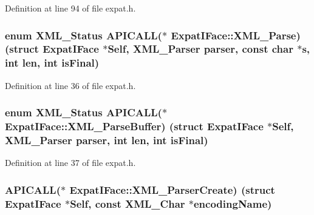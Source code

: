 Definition at line 94 of file expat.\+h.

\subsubsection[{\texorpdfstring{X\+M\+L\+\_\+\+Parse}{XML_Parse}}]{\setlength{\rightskip}{0pt plus 5cm}enum {\bf X\+M\+L\+\_\+\+Status} A\+P\+I\+C\+A\+LL($\ast$ Expat\+I\+Face\+::\+X\+M\+L\+\_\+\+Parse) (struct {\bf Expat\+I\+Face} $\ast$Self, {\bf X\+M\+L\+\_\+\+Parser} parser, {\bf const} char $\ast${\bf s}, {\bf int} {\bf len}, {\bf int} is\+Final)}\hypertarget{struct_expat_i_face_a05bedd71a3ea3efc2612dff99eb9cd5a}{}\label{struct_expat_i_face_a05bedd71a3ea3efc2612dff99eb9cd5a}


Definition at line 36 of file expat.\+h.

\subsubsection[{\texorpdfstring{X\+M\+L\+\_\+\+Parse\+Buffer}{XML_ParseBuffer}}]{\setlength{\rightskip}{0pt plus 5cm}enum {\bf X\+M\+L\+\_\+\+Status} A\+P\+I\+C\+A\+LL($\ast$ Expat\+I\+Face\+::\+X\+M\+L\+\_\+\+Parse\+Buffer) (struct {\bf Expat\+I\+Face} $\ast$Self, {\bf X\+M\+L\+\_\+\+Parser} parser, {\bf int} {\bf len}, {\bf int} is\+Final)}\hypertarget{struct_expat_i_face_a86cb0195b28c9777af4963c61a01493b}{}\label{struct_expat_i_face_a86cb0195b28c9777af4963c61a01493b}


Definition at line 37 of file expat.\+h.

\subsubsection[{\texorpdfstring{X\+M\+L\+\_\+\+Parser\+Create}{XML_ParserCreate}}]{ A\+P\+I\+C\+A\+LL($\ast$ Expat\+I\+Face\+::\+X\+M\+L\+\_\+\+Parser\+Create) (struct {\bf Expat\+I\+Face} $\ast$Self, {\bf const} {\bf X\+M\+L\+\_\+\+Char} $\ast$encoding\+Name)}\hypertarget{struct_expat_i_face_a3cc7fbc45f8a7642201893171489effc}{}\label{struct_expat_i_face_a3cc7fbc45f8a7642201893171489effc}


